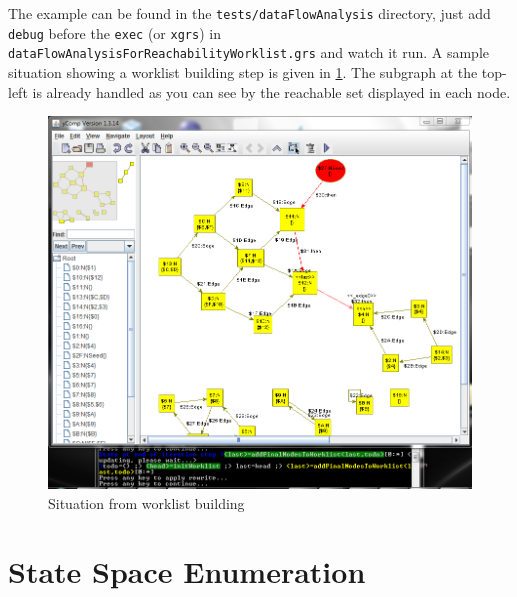 The example can be found in the \texttt{tests/dataFlowAnalysis} directory, just add \texttt{debug} before the \texttt{exec} (or \texttt{xgrs}) in \texttt{dataFlowAnalysisForReachabilityWorklist.grs} and watch it run.
A sample situation showing a worklist building step is given in \ref{figworklist}.
The subgraph at the top-left is already handled as you can see by the reachable set displayed in each node.

\begin{figure}[htbp]
  \centering
  \includegraphics[width=\textwidth]{fig/Worklist}
  \caption{Situation from worklist building}
  \label{figworklist}
\end{figure}


\section{State Space Enumeration}\label{sec:statespaceenum}

